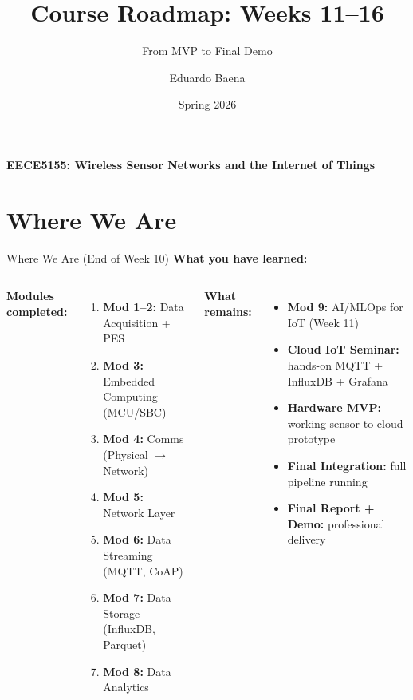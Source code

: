 \documentclass[aspectratio=169,11pt]{beamer}
\title[EECE5155 -- Weeks 11--16]{Course Roadmap: Weeks 11--16}
\subtitle{From MVP to Final Demo}
\author{Eduardo Baena}
\date{Spring 2026}
\institute{Northeastern University\\Department of Electrical and Computer Engineering\\
\texttt{e.baena@northeastern.edu}}
\begin{document}
\begin{frame}
    \titlepage
    \vspace{-1cm}
    \begin{center}
        \textbf{EECE5155: Wireless Sensor Networks and the Internet of Things}
    \end{center}
\end{frame}

\section{Where We Are}

\begin{frame}{Where We Are (End of Week 10)}
    \textbf{What you have learned:}

    \vspace{0.2cm}
    \begin{columns}
        \textbf{Modules completed:}
        \begin{enumerate}
            \item[\checkmark] \textbf{Mod 1--2:} Data Acquisition + PES
            \item[\checkmark] \textbf{Mod 3:} Embedded Computing (MCU/SBC)
            \item[\checkmark] \textbf{Mod 4:} Comms (Physical $\rightarrow$ Network)
            \item[\checkmark] \textbf{Mod 5:} Network Layer
            \item[\checkmark] \textbf{Mod 6:} Data Streaming (MQTT, CoAP)
            \item[\checkmark] \textbf{Mod 7:} Data Storage (InfluxDB, Parquet)
            \item[\checkmark] \textbf{Mod 8:} Data Analytics
        \end{enumerate}

        \textbf{What remains:}
        \begin{itemize}
            \item \textbf{Mod 9:} AI/MLOps for IoT (Week 11)
            \item \textbf{Cloud IoT Seminar:} hands-on MQTT + InfluxDB + Grafana
            \item \textbf{Hardware MVP:} working sensor-to-cloud prototype
            \item \textbf{Final Integration:} full pipeline running
            \item \textbf{Final Report + Demo:} professional delivery
        \end{itemize}
    \end{columns}


\end{frame}
\end{document}
